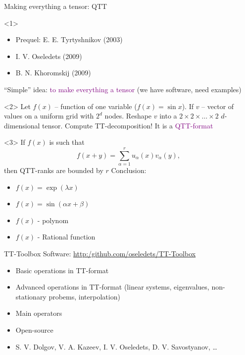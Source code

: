 \documentclass{beamer}[14pt, presentation]
\begin{document}
\begin{frame}[label=sec-5-7]{Making everything a tensor: QTT}
\begin{onlyenv}<1>
\begin{itemize}
\item Prequel: E. E. Tyrtyshnikov (2003)
\item I. V. Oseledets (2009)
\item B. N. Khoromskij (2009)
\end{itemize}
\vskip 2mm
  ``Simple'' idea: \textcolor{purple}{to make everything a tensor} (we
  have  software, need examples)
\end{onlyenv}

\begin{onlyenv}<2>
Let $f(x)$ -- function of one variable ($f(x) = \sin x$).
\vskip 2mm
If $v$ -- vector of values on a uniform grid with  $2^d$  nodes.
\vskip 2mm
Reshape $v$ into a  $2 \times 2 \times \ldots \times 2$
$d$-dimensional tensor.
\vskip 2mm
Compute TT-decomposition!
\vskip 2mm
It is a \textcolor{purple}{QTT-format}
\end{onlyenv}

\begin{onlyenv}<3>
 If $f(x)$ is such that 
$$f(x+y) = \sum_{\alpha=1}^r u_{\alpha}(x) v_{\alpha}(y),$$
then QTT-ranks are bounded by $r$
\vskip 2mm
Conclusion: \\
\begin{itemize}
\item $f(x) = \exp(\lambda x)$
\item $f(x) = \sin (\alpha x + \beta)$
\item $f(x)$ - polynom
\item $f(x)$ - Rational function
\end{itemize}
\end{onlyenv}
\end{frame}

\begin{frame}[label=sec-5-8]{TT-Toolbox}
Software: \url{http:/github.com/oseledets/TT-Toolbox}
\begin{itemize}
\item Basic operations in TT-format
\item Advanced operations in  TT-format (linear systems, eigenvalues,
non-stationary probems, interpolation)
\item Main operators
\item Open-source
\item S. V. Dolgov, V. A. Kazeev, I. V. Oseledets, D. V. Savostyanov, \ldots{}
\end{itemize}
\end{frame}
\end{document}
